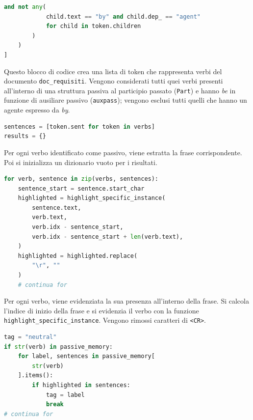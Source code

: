 \documentclass[12pt]{report}
\begin{document}
\begin{mdframed}
\small
\begin{lstlisting}[language=Python]
        and not any(
            child.text == "by" and child.dep_ == "agent"
            for child in token.children
        )
    )
]
\end{lstlisting}
\end{mdframed}

\noindent Questo blocco di codice crea una lista di token che rappresenta verbi del documento \texttt{doc\_requisiti}. Vengono considerati tutti quei verbi presenti all'interno di una struttura passiva al participio passato (\texttt{Part}) e hanno \textit{be} in funzione di ausiliare passivo (\texttt{auxpass}); vengono esclusi tutti quelli che hanno un agente espresso da \textit{by}.


\begin{mdframed}
\small
\begin{lstlisting}[language=Python]
sentences = [token.sent for token in verbs]
results = {}
\end{lstlisting}
\end{mdframed}

\noindent Per ogni verbo identificato come passivo, viene estratta la frase corrispondente. Poi si inizializza un dizionario vuoto per i risultati.


\begin{mdframed}
\small
\begin{lstlisting}[language=Python]
for verb, sentence in zip(verbs, sentences):
    sentence_start = sentence.start_char
    highlighted = highlight_specific_instance(
        sentence.text,
        verb.text,
        verb.idx - sentence_start,
        verb.idx - sentence_start + len(verb.text),
    )
    highlighted = highlighted.replace(
        "\r", ""
    )
    # continua for
\end{lstlisting}
\end{mdframed}

\noindent Per ogni verbo, viene evidenziata la sua presenza all'interno della frase. Si calcola l'indice di inizio della frase e si evidenzia il verbo con la funzione \texttt{highlight\_specific\_instance}. Vengono rimossi caratteri di \texttt{<CR>}.


\begin{mdframed}
\small
\begin{lstlisting}[language=Python]
tag = "neutral"
if str(verb) in passive_memory:
    for label, sentences in passive_memory[
        str(verb)
    ].items():
        if highlighted in sentences:
            tag = label
            break
# continua for
\end{lstlisting}
\end{mdframed}
\end{document}
